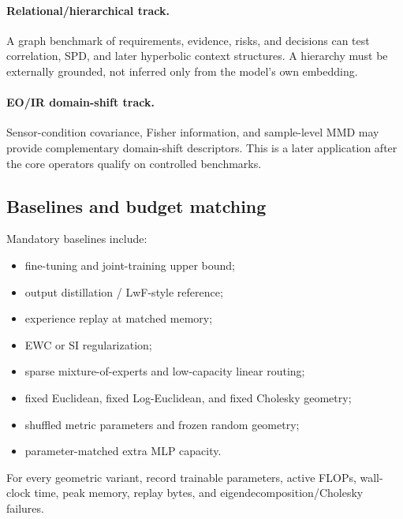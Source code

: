\paragraph{Relational/hierarchical track.}
A graph benchmark of requirements, evidence, risks, and decisions can test correlation, SPD, and later hyperbolic context structures. A hierarchy must be externally grounded, not inferred only from the model's own embedding.

\paragraph{EO/IR domain-shift track.}
Sensor-condition covariance, Fisher information, and sample-level MMD may provide complementary domain-shift descriptors. This is a later application after the core \RGM{} operators qualify on controlled benchmarks.

\subsection{Baselines and budget matching}
Mandatory baselines include:
\begin{itemize}[leftmargin=1.5em]
  \item fine-tuning and joint-training upper bound;
  \item output distillation / LwF-style reference;
  \item experience replay at matched memory;
  \item EWC or SI regularization;
  \item sparse mixture-of-experts and low-capacity linear routing;
  \item fixed Euclidean, fixed Log-Euclidean, and fixed Cholesky geometry;
  \item shuffled metric parameters and frozen random geometry;
  \item parameter-matched extra MLP capacity.
\end{itemize}
For every geometric variant, record trainable parameters, active FLOPs, wall-clock time, peak memory, replay bytes, and eigendecomposition/Cholesky failures.

